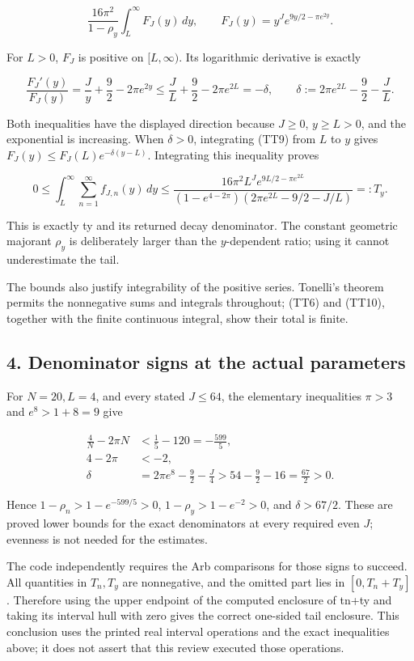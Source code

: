 \[
\frac{16\pi^2}{1-\rho_y}
\int_L^\infty F_J(y)\,dy,\qquad
F_J(y)=y^Je^{9y/2-\pi e^{2y}}.
\tag{TT8}
\]

For \(L>0\), \(F_J\) is positive on \([L,\infty)\). Its logarithmic derivative is exactly

\[
\frac{F_J'(y)}{F_J(y)}
=\frac Jy+\frac92-2\pi e^{2y}
\le\frac JL+\frac92-2\pi e^{2L}
=-\delta,\qquad
\delta:=2\pi e^{2L}-\frac92-\frac JL.
\tag{TT9}
\]

Both inequalities have the displayed direction because \(J\ge0\), \(y\ge L>0\), and the exponential is increasing. When \(\delta>0\), integrating (TT9) from \(L\) to \(y\) gives \(F_J(y)\le F_J(L)e^{-\delta(y-L)}\). Integrating this inequality proves

\[
\boxed{
0\le\int_L^\infty\sum_{n=1}^{\infty}f_{J,n}(y)\,dy
\le
\frac{16\pi^2L^Je^{9L/2-\pi e^{2L}}}
{(1-e^{4-2\pi})(2\pi e^{2L}-9/2-J/L)}
=:T_y.}
\tag{TT10}
\]

This is exactly ty and its returned decay denominator. The constant geometric majorant \(\rho_y\) is deliberately larger than the \(y\)-dependent ratio; using it cannot underestimate the tail.

The bounds also justify integrability of the positive series. Tonelli's theorem permits the nonnegative sums and integrals throughout; (TT6) and (TT10), together with the finite continuous integral, show their total is finite.

\subsection{4. Denominator signs at the actual parameters}\label{denominator-signs-at-the-actual-parameters}

For \(N=20,L=4\), and every stated \(J\le64\), the elementary inequalities \(\pi>3\) and \(e^8>1+8=9\) give

\[
\begin{aligned}
\frac4N-2\pi N&<\frac15-120=-\frac{599}{5},\\
4-2\pi&<-2,\\
\delta
&=2\pi e^8-\frac92-\frac J4
>54-\frac92-16=\frac{67}{2}>0.
\end{aligned}
\tag{TT11}
\]

Hence \(1-\rho_n>1-e^{-599/5}>0\), \(1-\rho_y>1-e^{-2}>0\), and \(\delta>67/2\). These are proved lower bounds for the exact denominators at every required even \(J\); evenness is not needed for the estimates.

The code independently requires the Arb comparisons for those signs to succeed. All quantities in \(T_n,T_y\) are nonnegative, and the omitted part lies in \([0,T_n+T_y]\). Therefore using the upper endpoint of the computed enclosure of tn+ty and taking its interval hull with zero gives the correct one-sided tail enclosure. This conclusion uses the printed real interval operations and the exact inequalities above; it does not assert that this review executed those operations.

